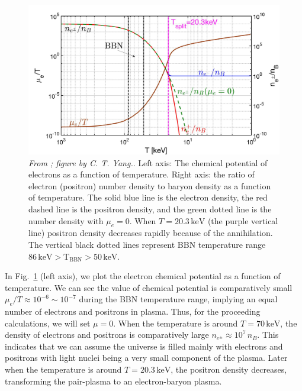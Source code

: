 \begin{figure}[ht]
\begin{center}
\includegraphics[width=0.95\linewidth]{plots/chap03BBN/May152023_EPDensity_Chemical}
\caption{\textit{From \cite{Grayson:2023flr}; figure by C. T. Yang.}. Left axis: The chemical potential of electrons as a function of temperature. Right axis: the ratio of electron (positron) number density to baryon density as a function of temperature. The solid blue line is the electron density, the red dashed line is the positron density, and the green dotted line is the number density with $\mu_e=0$. When $T=20.3\,\mathrm{keV}$ (the purple vertical line) positron density decreases rapidly because of the annihilation. The vertical black dotted lines represent BBN temperature range $86\,\mathrm{keV}>\mathrm{T_{BBN}}>50\,\mathrm{keV}$.}
\label{BBN_Electron}
\end{center}
\end{figure}

In Fig.~\ref{BBN_Electron} (left axis), we plot the electron chemical potential as a function of temperature. We can see the value of chemical potential is comparatively small $\mu_e/T\approx10^{-6}\sim10^{-7}$ during the BBN temperature range, implying an equal number of electrons and positrons in plasma. Thus, for the proceeding calculations, we will set $\mu =0$.  When the temperature is around $T=70\,\mathrm{keV}$, the density of electrons and positrons is comparatively large $n_{e^\pm}\approx10^7\,n_B$. This indicates that we can assume the universe is filled mainly with electrons and positrons with light nuclei being a very small component of the plasma. Later when the temperature is around $T=20.3\,\mathrm{keV}$, the positron density decreases, transforming the pair-plasma to an electron-baryon plasma.


